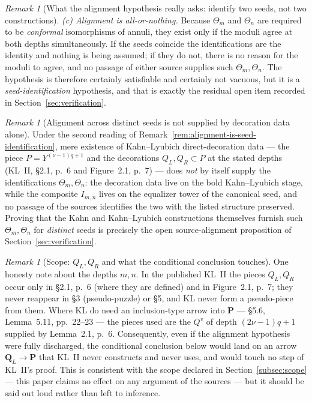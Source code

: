 \documentclass[11pt,reqno]{amsart}
\theoremstyle{definition}
\theoremstyle{remark}
\newtheorem{remark}[theorem]{Remark}
\begin{document}
\begin{remark}[What the alignment hypothesis really asks: identify two
seeds, not two constructions]
\emph{(c) Alignment is all-or-nothing.}  Because $\Theta_{m}$ and
$\Theta_{n}$ are required to be \emph{conformal} isomorphisms of
annuli, they exist only if the moduli agree at both depths
simultaneously.  If the seeds coincide the identifications are the
identity and nothing is being assumed; if they do not, there is no
reason for the moduli to agree, and no passage of either source
supplies such $\Theta_{m},\Theta_{n}$.  The hypothesis is therefore
certainly satisfiable and certainly not vacuous, but it is a
\emph{seed-identification} hypothesis, and that is exactly the
residual open item recorded in Section~\ref{sec:verification}.
\end{remark}

\begin{remark}[Alignment across distinct seeds is not supplied by
decoration data alone]
\label{rem:alignment-not-free}
Under the second reading of
Remark~\ref{rem:alignment-is-seed-identification}, mere existence of
Kahn--Lyubich direct-decoration data --- the piece
$P=Y^{(\nu-1)q+1}$ and the decorations $Q_{L},Q_{R}\subset P$ at the
stated depths (KL~II, \S2.1, p.~6 and Figure~2.1, p.~7) --- does
\emph{not} by itself supply the identifications
$\Theta_{m},\Theta_{n}$: the decoration data live on the bold
Kahn--Lyubich stage, while the composite $I_{m,n}$ lives on the
equalizer tower of the canonical seed, and no passage of the sources
identifies the two with the listed structure preserved.  Proving that
the Kahn and Kahn--Lyubich constructions themselves furnish such
$\Theta_{m},\Theta_{n}$ for \emph{distinct} seeds is precisely the
open source-alignment proposition of
Section~\ref{sec:verification}.
\end{remark}

\begin{remark}[Scope: $Q_{L},Q_{R}$ and what the conditional
conclusion touches]\label{rem:QLQR-scope}
One honesty note about the depths $m,n$.  In the published KL~II the
pieces $Q_{L},Q_{R}$ occur only in \S2.1, p.~6 (where they are
defined) and in Figure~2.1, p.~7; they never reappear in \S3
(pseudo-puzzle) or \S5, and KL never form a pseudo-piece from them.
Where KL do need an inclusion-type arrow into $\mathbf P$ --- \S5.6,
Lemma~5.11, pp.~22--23 --- the pieces used are the $Q^{v}$ of depth
$(2\nu-1)q+1$ supplied by Lemma~2.1, p.~6.  Consequently, even if the
alignment hypothesis were fully discharged, the conditional conclusion
below would land on an arrow $\mathbf Q_{L}\to\mathbf P$ that KL~II
never constructs and never uses, and would touch no step of KL~II's
proof.  This is consistent with the scope declared in
Section~\ref{subsec:scope} --- this paper claims no effect on any
argument of the sources --- but it should be said out loud rather than
left to inference.
\end{remark}
\end{document}
